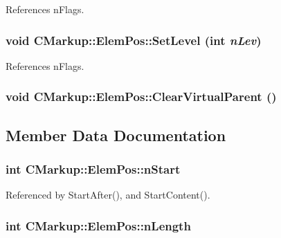 References nFlags.
\subsubsection[SetLevel]{\setlength{\rightskip}{0pt plus 5cm}void CMarkup::ElemPos::SetLevel (int {\em nLev})\hspace{0.3cm}{\tt  [inline]}}\label{structCMarkup_1_1ElemPos_625d84902ebb86bda4d5c5720f00e885}




References nFlags.
\subsubsection[ClearVirtualParent]{\setlength{\rightskip}{0pt plus 5cm}void CMarkup::ElemPos::ClearVirtualParent ()\hspace{0.3cm}{\tt  [inline]}}\label{structCMarkup_1_1ElemPos_b70cf4ad47e44a2d4c7f6c06a2ff0659}




\subsection{Member Data Documentation}
\subsubsection[nStart]{\setlength{\rightskip}{0pt plus 5cm}int {\bf CMarkup::ElemPos::nStart}}\label{structCMarkup_1_1ElemPos_37cbff8b4e0d5b086970efb1bc9b70fe}




Referenced by StartAfter(), and StartContent().
\subsubsection[nLength]{\setlength{\rightskip}{0pt plus 5cm}int {\bf CMarkup::ElemPos::nLength}}\label{structCMarkup_1_1ElemPos_d9d89d7af0f4cb69b0b1f4d0b5d4953f}




